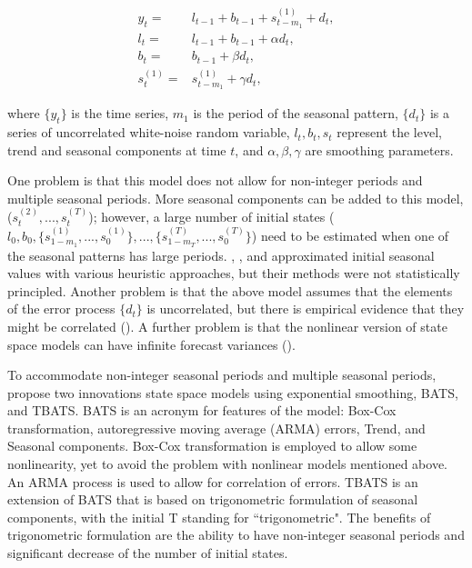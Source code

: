 \documentclass{uwstat572}
\begin{document}
\begin{subequations}
\begin{align}
 y_t=&l_{t-1}+b_{t-1}+s_{t-m_1}^{(1)}+d_t, \label{eqn:measurement.simple}\\
 l_t=&l_{t-1}+b_{t-1}+\alpha d_t,\label{eqn:level.simple} \\
 b_t=&b_{t-1}+\beta d_t,\label{eqn:trend.simple} \\
 s_t^{(1)}=&s_{t-m_1}^{(1)}+\gamma d_t,\label{eqn:error.simple}
\end{align}
\label{eqn:simple}
\end{subequations}

\noindent where $\{y_t\}$ is the time series, $m_1$ is the period of the seasonal pattern, $\{d_t\}$ is a series of uncorrelated white-noise random variable, $l_t, b_t, s_t$ represent the level, trend and seasonal components at time $t$, and $\alpha,\beta,\gamma$ are smoothing parameters.

One problem is that this model does not allow for non-integer periods and multiple seasonal periods. More seasonal components can be added to this model, ($s_t^{(2)},...,s_t^{(T)}$); however, a large number of initial states ($l_0, b_0, \{ s^{(1)}_{1-m_1}, ..., s_0^{(1)} \},...,  \{ s^{(T)}_{1-m_T}, ..., s_0^{(T)} \}$) need to be estimated when one of the seasonal patterns has large periods. \citet{taylor2003short}, \citet{taylor2010triple}, and \citet{gould2008forecasting} approximated initial seasonal values with various heuristic approaches, but their methods were not statistically principled. Another problem is that the above model assumes that the elements of the error process $\{d_t\}$ is uncorrelated, but there is empirical evidence that they might be correlated (\citet{taylor2003short}). A further problem is that the nonlinear version of state space models can have infinite forecast variances (\citet{akram2009exponential}). 

To accommodate non-integer seasonal periods and multiple seasonal periods, \citet{de2011forecasting} propose two innovations state space models using exponential smoothing, BATS, and TBATS. BATS is an acronym for features of the model: Box-Cox transformation, autoregressive moving average (ARMA) errors, Trend, and Seasonal components. Box-Cox transformation is employed to allow some nonlinearity, yet to avoid the problem with nonlinear models mentioned above. An ARMA process is used to allow for correlation of errors. TBATS is an extension of BATS that is based on trigonometric formulation of seasonal components, with the initial T standing for ``trigonometric". The benefits of trigonometric formulation are the ability to have non-integer seasonal periods and significant decrease of the number of initial states. 
\end{document}
